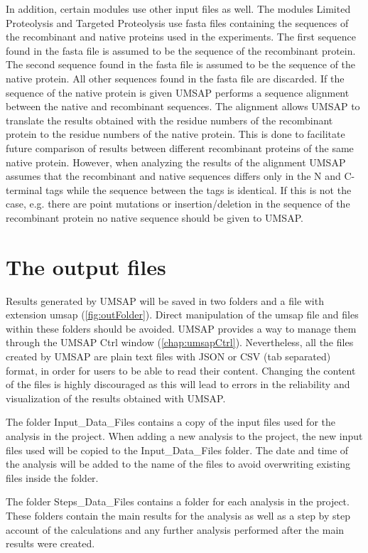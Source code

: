 In addition, certain modules use other input files as well. The modules Limited Proteolysis
and Targeted Proteolysis use fasta files containing the sequences of
the recombinant and native proteins used in the experiments. The first sequence
found in the fasta file is assumed to be the sequence of the recombinant protein.
The second sequence found in the fasta file is assumed to be the sequence of the
native protein. All other sequences found in the fasta file are discarded. If the
sequence of the native protein is given UMSAP performs a sequence alignment between
the native and recombinant sequences. The alignment allows UMSAP to translate the
results obtained with the residue numbers of the recombinant protein to the residue
numbers of the native protein. This is done to facilitate future comparison of results
between different recombinant proteins of the same native protein. However, when
analyzing the results of the alignment UMSAP assumes that the recombinant and native
sequences differs only in the N and C-terminal tags while the sequence between the
tags is identical. If this is not the case, e.g. there are point mutations or
insertion/deletion in the sequence of the recombinant protein no native sequence
should be given to UMSAP.

\section{The output files}
\label{sec:outFile}

Results generated by UMSAP will be saved in two folders and a file with extension
umsap (\autoref{fig:outFolder}). Direct manipulation of the umsap file and files
within these folders should be avoided. UMSAP provides a way to manage them through
the UMSAP Ctrl window (\autoref{chap:umsapCtrl}). Nevertheless, all the files created
by UMSAP are plain text files with JSON or CSV (tab separated) format, in order for
users to be able to read their content. Changing the content of the files is highly
discouraged as this will lead to errors in the reliability and visualization of the
results obtained with UMSAP.

The folder Input{\_}Data{\_}Files contains a copy of the input files used for the analysis
in the project. When adding a new analysis to the project, the new input files used
will be copied to the Input{\_}Data{\_}Files folder. The date and time of the analysis will
be added to the name of the files to avoid overwriting existing files inside the folder.

The folder Steps{\_}Data{\_}Files contains a folder for each analysis in the project.
These folders contain the main results for the analysis as well as a step by step
account of the calculations and any further analysis performed after the main results
were created.

